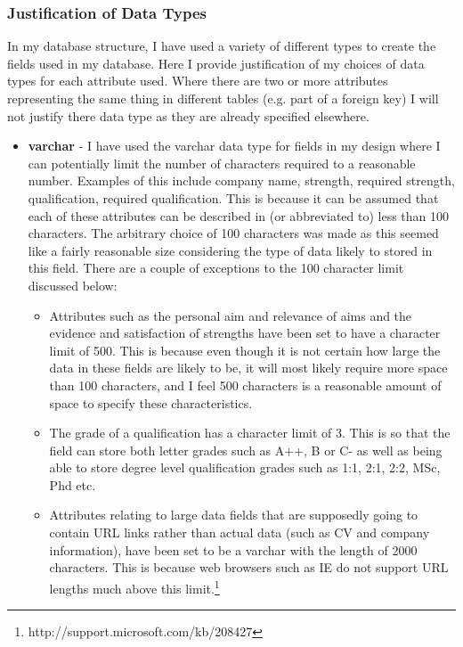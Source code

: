 \documentclass{article}
\begin{document}
\subsubsection{Justification of Data Types}
In my database structure, I have used a variety of different types to create the fields used in my database. Here I provide justification of my choices of data types for each attribute used. Where there are two or more attributes representing the same thing in different tables (e.g. part of a foreign key) I will not justify there data type as they are already specified elsewhere.

\begin{itemize}
\item \textbf{varchar} - I have used the varchar data type for fields in my design where I can potentially limit the number of characters required to a reasonable number. Examples of this include company name, strength, required strength, qualification, required qualification. This is because it can be assumed that each of these attributes can be described in (or abbreviated to) less than 100 characters. The arbitrary choice of 100 characters was made as this seemed like a fairly reasonable size considering the type of data likely to stored in this field. There are a couple of exceptions to the 100 character limit discussed below:

\begin{itemize}
\item Attributes such as the personal aim and relevance of aims and the evidence and satisfaction of strengths have been set to have a character limit of 500. This is because even though it is not certain how large the data in these fields are likely to be, it will most likely require more space than 100 characters, and I feel 500 characters is a reasonable amount of space to specify these characteristics.

\item The grade of a qualification has a character limit of 3. This is so that the field can store both letter grades such as A++, B or C- as well as being able to store degree level qualification grades such as 1:1, 2:1, 2:2, MSc, Phd etc. 

\item Attributes relating to large data fields that are supposedly going to contain URL links rather than actual data (such as CV and company information), have been set to be a varchar with the length of 2000 characters. This is because web browsers such as IE do not support URL lengths much above this limit.\footnote{http://support.microsoft.com/kb/208427}


\end{itemize}
\end{itemize}
\end{document}
